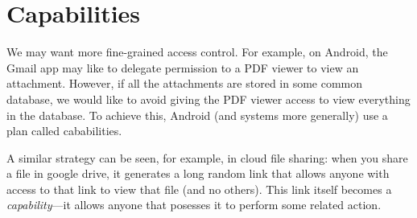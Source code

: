 \section{Capabilities}
We may want more fine-grained access control. For example, on Android, the Gmail app may like to delegate permission to a PDF viewer to view an attachment. However, if all the attachments are stored in some common database, we would like to avoid giving the PDF viewer access to view everything in the database. To achieve this, Android (and systems more generally) use a plan called cababilities.

A similar strategy can be seen, for example, in cloud file sharing: when you share a file in google drive, it generates a long random link that allows anyone with access to that link to view that file (and no others). This link itself becomes a \emph{capability}---it allows anyone that posesses it to perform some related action.
